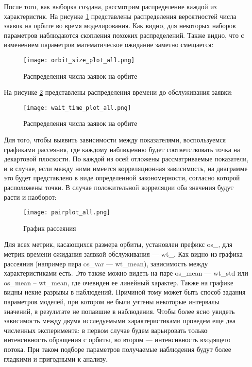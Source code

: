После того, как выборка создана, рассмотрим распределение каждой из характеристик. На рисунке \ref{orbit_size_plot_all} представлены распределения вероятностей числа заявок на орбите во время моделирования. Как видно, для некоторых наборов параметров наблюдаются скопления похожих распределений. Также видно, что с изменением параметров математическое ожидание заметно смещается:

\begin{figure}[H]
	\centering
	\texttt{[image: orbit\_size\_plot\_all.png]}
	\caption{Распределения числа заявок на орбите} 
	\label{orbit_size_plot_all}
\end{figure}

На рисунке \ref{wait_time_plot_all} представлены распределения времени до обслуживания заявки:

\begin{figure}[H]
	\centering
	\texttt{[image: wait\_time\_plot\_all.png]}
	\caption{Распределения числа заявок на орбите} 
	\label{wait_time_plot_all}
\end{figure}

Для того, чтобы выявить зависимости между показателями, воспользуемся графиками рассеяния, где каждому наблюдению будет соответствовать точка на декартовой плоскости. По каждой из осей отложены рассматриваемые показатели, и в случае, если между ними имеется корреляционная зависимость, на диаграмме это будет представлено в виде определенной закономерности, согласно которой расположены точки. В случае положительной корреляции оба значения будут расти и наоборот:
\begin{figure}[H]
	\centering
	\texttt{[image: pairplot\_all.png]}
	\caption{График рассеяния} 
	\label{os_wt_pairplot_all}
\end{figure}

Для всех метрик, касающихся размера орбиты, установлен префикс os\_, для метрик времени ожидания заявкой обслуживания --- wt\_. Как видно из графика рассеяния (например пара os\_var --- wt\_mean), зависимость между характеристиками есть. Это также можно видеть на паре os\_mean --- wt\_std или os\_mean -- wt\_mean, где очевиден ее линейный характер. Также на графике видны некие разрывы в наблюдений. Причиной тому может быть способ задания параметров моделей, при котором не были учтены некоторые интервалы значений, в результате не попавшие в наблюдения. Чтобы более ясно увидеть зависимость между двумя исследуемыми характеристиками проведем еще два численных эксперимента: в первом случае будем варьировать только интенсивность обращения с орбиты, во втором --- интенсивность входящего потока. При таком подборе параметров получаемые наблюдения будут более гладкими и пригодными к анализу.

